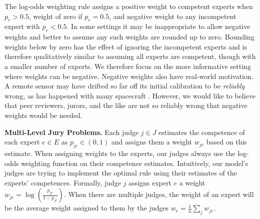 \documentclass[letterpaper]{article} %
\newcommand{\judge}{\ensuremath{j} }
\newcommand{\judges}{\ensuremath{J} }
\newcommand{\experts}{\ensuremath{E} }
\newcommand{\expert}{\ensuremath{e} }
\begin{document}
The log-odds weighting rule assigns a positive weight to competent experts when $p_e > 0.5$, weight of zero if $p_\expert = 0.5$, and negative weight to any incompetent expert with $p_\expert < 0.5$. In some settings it may be inappropriate to allow negative weights and better to assume any such weights are rounded up to zero. Bounding weights below by zero has the effect of ignoring the incompetent experts and is therefore qualitatively similar to assuming all experts are competent, though with a smaller number of experts. We therefore focus on the more informative setting where weights can be negative. Negative weights also have real-world motivation. A remote sensor may have drifted so far off its initial calibration to be \emph{reliably} wrong, as has happened with many spacecraft \cite{bar2003effect}. However, we would like to believe that peer reviewers, jurors, and the like are not so reliably wrong that negative weights would be needed.


\noindent
\textbf{Multi-Level Jury Problems.\;}
Each judge $\judge \in \judges$ estimates the competence of each expert $\expert \in \experts$ as $p_{\judge \expert} \in (0,1)$ and assigns them a weight $w_{\judge\expert}$ based on this estimate.
%
When assigning weights to the experts, our judges always use the log-odds weighting function on their competence estimates.
%
Intuitively, our model's judges are trying to implement the optimal rule using their estimates of the experts' competences.
%
Formally, judge $\judge$ assigns expert $\expert$ a weight $w_{\judge\expert} = \log(\frac{p_{\judge\expert}}{1-p_{\judge\expert}})$.
%
When there are multiple judges, the weight of an expert will be the average weight assigned to them by the judges $w_\expert = \frac{1}{n} \sum\limits_{\judge} w_{\judge \expert}$.
%
\end{document}
